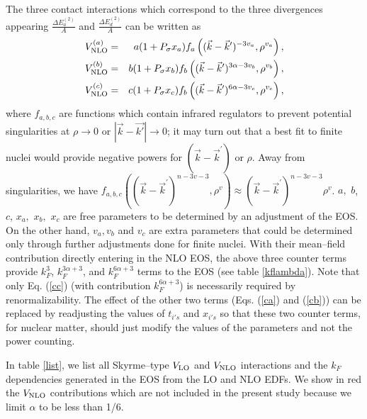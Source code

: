 \documentclass[aps,11pt,prc,preprint,superscriptaddress,nofootinbib]{revtex4}
\begin{document}
The three contact interactions which correspond to the three divergences appearing $\frac{\Delta E_{a}^{(2)}}{A}$ and $\frac{\Delta E_{d}^{(2)}}{A}$ can be written as  
\begin{eqnarray}
V_{\rm NLO}^{(a)}&=&a(1+P_{\sigma }x_{a})f_a\left((\vec{k}-\vec{k}^{\prime
})^{-3v_a},\rho ^{v_a}\right),  \label{ca} \\
V_{\rm NLO}^{(b)}&=&b(1+P_{\sigma }x_{b})f_b\left((\vec{k}-\vec{k}^{\prime
})^{3\alpha-3v_b},\rho ^{v_b}\right),  \label{cb} \\
V_{\rm NLO}^{(c)}&=&c(1+P_{\sigma }x_{c})f_b\left((\vec{k}-\vec{k}^{\prime
})^{6\alpha-3v_c},\rho ^{v_c}\right),  \label{cc}
\end{eqnarray}
where $f_{a,b,c}$ are functions which contain infrared regulators to prevent potential singularities at $\rho\rightarrow 0$ or $|\vec{k}-\vec{k'}|\rightarrow 0$; it may turn out that a best fit to finite nuclei would provide negative powers for $(\vec{k}-\vec{k}^{\prime
})$ or $\rho$. Away from singularities, we have $f_{a,b,c}\left((\vec{k}-\vec{k}^{\prime
})^{n-3v-3},\rho ^{v}\right)\approx (\vec{k}-\vec{k}^{\prime
})^{n-3v-3}\rho ^{v}$. $a,$ $b$, $c$, $x_{a},$ $x_{b},$ $x_{c}$ are free parameters to be determined by an adjustment of the EOS. 
On the other hand, $v_a, v_b$ and $v_c$ are extra parameters that could be determined only through further adjustments done for finite nuclei.
With their mean--field contribution directly entering in the NLO EOS, the above three counter terms provide $k_F^3$, $k_F^{3\alpha+3}$, and $k_F^{6\alpha+3}$ terms to the EOS (see table \ref{kflambda}). 
Note that only Eq. (\ref{cc}) (with contribution $k_F^{6\alpha+3}$) is necessarily required by renormalizability. The effect of the other two terms (Eqs. (\ref{ca}) and (\ref{cb})) can be replaced by readjusting the values of $t_{i's}$ and $x_{i's}$ so that these two counter terms, for nuclear matter, should just modify the values of the parameters and not the power counting. 

In table \ref{list}, we list all Skyrme--type $V_{\rm LO}$ and $V_{ \rm NLO}$ interactions and the $k_F$ dependencies generated in the EOS from the LO and NLO EDFs. We show in red the $V_{ \rm NLO}$ contributions which are not included in the present study because we limit $\alpha$ to be less than 1/6.
\end{document}
